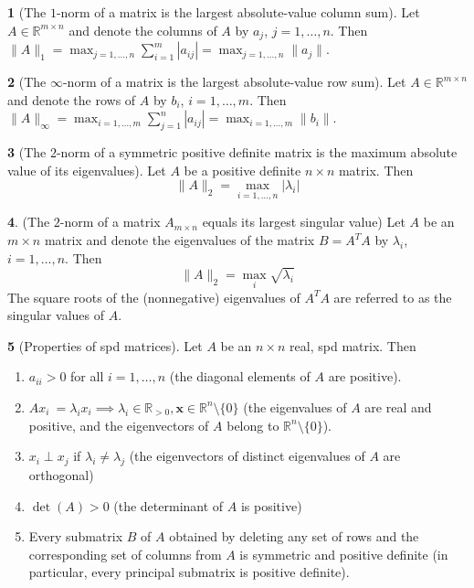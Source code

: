 \documentclass[12pt]{article}
\theoremstyle{definition}
\newtheorem{theorem}{\color{ForestGreen}{\textbf{Theorem}}}
\newcommand{\R}{\mathbb{R}}
\newcommand{\norm}[1]{\lVert#1\rVert}
\newcommand{\x}{\bm{x}}
\begin{document}
\begin{theorem}[The $1$-norm of a matrix is the largest absolute-value column sum]
Let $A \in \R^{m \times n }$ and denote the columns of $A$ by $a_j$, $j=1, \ldots, n$. Then $\norm{A}_1 = \max_{j=1, \ldots, n} \sum_{i=1}^{m} |a_{ij}| =  \max_{j=1, \ldots, n} \norm{a_j}$.
\end{theorem}

\begin{theorem}[The $\infty$-norm of a matrix is the largest absolute-value row sum]
Let $A \in \R^{m \times n }$ and denote the rows of $A$ by $b_i$, $i=1, \ldots, m$. Then $\norm{A}_{\infty} = \max_{i=1, \ldots, m} \sum_{j=1}^{n} |a_{ij}| =  \max_{i=1, \ldots, m} \norm{b_i}$.
\end{theorem}

\begin{theorem}[The $2$-norm of a symmetric positive definite matrix is the maximum absolute value of its eigenvalues]
Let $A$ be a positive definite $n \times n$ matrix. Then
\begin{equation}
\norm{A}_2 = \max_{i=1,\ldots, n} |\lambda_i|
\end{equation}
\end{theorem}

\begin{theorem}(The $2$-norm of a matrix $A_{m \times n}$ equals its largest singular value)
Let $A$ be an $m \times n$ matrix and denote the eigenvalues of the matrix $B = A^TA$ by $\lambda_i$, $i=1,\ldots, n$. Then
\begin{equation}
\norm{A}_2 = \max_i \sqrt{\lambda_i}
\end{equation}
The square roots of the (nonnegative) eigenvalues of $A^TA$ are referred to as the singular values of $A$.
\end{theorem}

\begin{theorem}[Properties of spd matrices]
Let $A$ be an $n \times n$ real, spd matrix. Then
\begin{enumerate}
\item $a_{ii} > 0$ for all $i=1, \ldots, n$ (the diagonal elements of $A$ are positive).
\item $A x_i \ = \lambda_i x_i \implies \lambda_i \in \R_{>0}, \x \in \R^n \setminus \{0\}$ (the eigenvalues of $A$ are real and positive, and the eigenvectors of $A$ belong to $\R^n \setminus \{0\}$).
\item $x_i \perp x_j$ if $\lambda_i \neq \lambda_j$ (the eigenvectors of distinct eigenvalues of $A$ are orthogonal)
\item $\det(A) > 0$ (the determinant of $A$ is positive)
\item Every submatrix $B$ of $A$ obtained by deleting any set of rows and the corresponding set of columns from $A$ is symmetric and positive definite (in particular, every principal submatrix is positive definite).
\end{enumerate}
\end{theorem}
\end{document}
